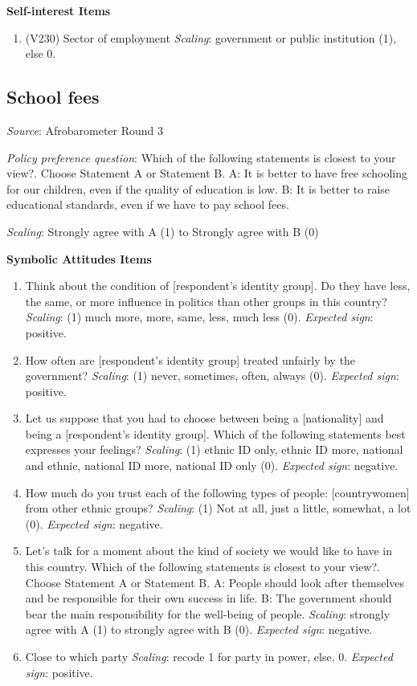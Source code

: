 \documentclass[]{article}
\begin{document}
\textbf{Self-interest Items }

\begin{enumerate}
 \item (V230) Sector of employment \textit{Scaling}: government or public institution (1), else 0.
\end{enumerate}

\subsection{School fees}\label{school-fees}

\textit{Source}: Afrobarometer Round 3

\textit{Policy preference question}: Which of the following statements
is closest to your view?. Choose Statement A or Statement B. A: It is
better to have free schooling for our children, even if the quality of
education is low. B: It is better to raise educational standards, even
if we have to pay school fees.

\textit{Scaling}: Strongly agree with A (1) to Strongly agree with B (0)

\textbf{Symbolic Attitudes Items}

\begin{enumerate}
  \item Think about the condition of [respondent’s identity group]. Do they have less, the same, or more influence in politics than other groups in this country? \textit{Scaling}: (1) much more, more, same, less, much less (0).  \textit{Expected sign}: positive.
  \item How often are [respondent’s identity group] treated unfairly by the government? \textit{Scaling}: (1) never, sometimes, often, always (0).  \textit{Expected sign}: positive.
  \item Let us suppose that you had to choose between being a [nationality] and being a [respondent’s identity group]. Which of the following statements best expresses your feelings? \textit{Scaling}: (1) ethnic ID only, ethnic ID more, national and ethnic, national ID more, national ID only (0).  \textit{Expected sign}: negative.
  \item How much do you trust each of the following types of people: [countrywomen] from other ethnic groups? \textit{Scaling}: (1) Not at all, just a little, somewhat, a lot (0).  \textit{Expected sign}: negative.
  \item Let’s talk for a moment about the kind of society we would like to have in this country. Which of the following statements is closest to your view?. Choose Statement A or Statement B. A: People should look after themselves and be responsible for their own success in life. B: The government should bear the main responsibility for the well-being of people. \textit{Scaling}: strongly agree with A (1) to strongly agree with B (0).  \textit{Expected sign}: negative.
  \item Close to which party \textit{Scaling}: recode 1 for party in power, else.  0.  \textit{Expected sign}: positive.
\end{enumerate}
\end{document}

